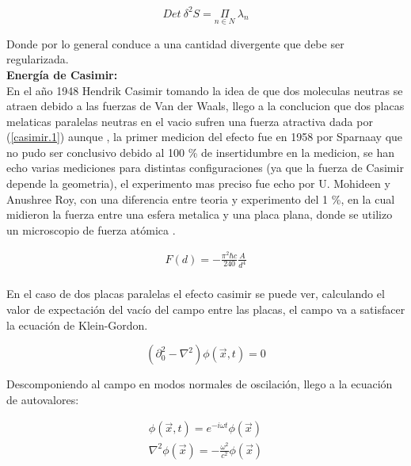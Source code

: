 \begin{equation}
Det \ \delta ^2 S = \underset{ n \in N }{ \Pi } \ \lambda _n
\end{equation}

Donde por lo general conduce a una cantidad divergente que debe ser regularizada.\\



\textbf{Energía de Casimir:} \\ 

En el año 1948 Hendrik Casimir tomando la idea de que dos moleculas neutras se atraen debido a las fuerzas de Van der Waals, llego a la conclucion que dos placas melaticas paralelas neutras en el vacio sufren una fuerza atractiva dada por (\ref{casimir.1}) aunque , la primer medicion del efecto fue en 1958 por Sparnaay que no pudo ser conclusivo debido al 100 \% de insertidumbre en la medicion, se han echo varias mediciones para distintas configuraciones (ya que la fuerza de Casimir depende la geometria), el experimento mas preciso fue echo por U. Mohideen y Anushree Roy, con una diferencia entre teoria y experimento del 1 \%, en la cual midieron la fuerza entre una esfera metalica y una placa plana, donde se utilizo un microscopio de fuerza atómica \cite{BORDAG20011} .


\begin{equation}
\begin{array}{c}
F(d) = - \frac{\pi ^2 \hbar c}{240} \frac{A}{d^4} \\
\end{array} 
\label{casimir.1}
\end{equation}




En el caso de dos placas paralelas el efecto casimir se puede ver, calculando el valor de expectación del vacío del campo entre las placas, el campo va a satisfacer la ecuación de Klein-Gordon.

\begin{equation}
( \partial _0 ^2 - \nabla  ^2  ) \phi (\vec{x} ,t) = 0 
\end{equation}

Descomponiendo al campo en modos normales de oscilación, llego a la ecuación de autovalores:

\begin{equation}
\begin{array}{c}
\phi ( \vec{x},t) = e ^{-i \omega t} \phi ( \vec{x}) \\
\nabla ^2 \phi ( \vec{x}) = - \frac{\omega ^2}{c ^2} \phi ( \vec{x})
\end{array}
\end{equation}


